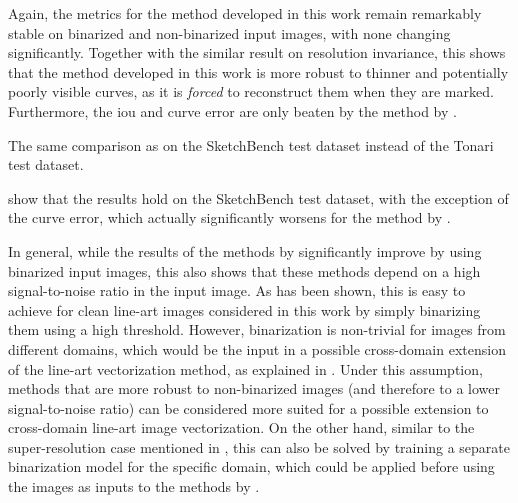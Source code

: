 Again, the metrics for the method developed in this work remain remarkably stable on binarized and non-binarized input images, with none changing significantly. Together with the similar result on resolution invariance, this shows that the method developed in this work is more robust to thinner and potentially poorly visible curves, as it is \emph{forced} to reconstruct them when they are marked. Furthermore, the \gls{iou} and curve error are only beaten by the method by \citet{Puhachov2021KeypointPolyvector}.

\begin{table}[h]
    \centering
    
    \caption{The same comparison as  on the SketchBench test dataset instead of the Tonari test dataset.}
    \label{tab:sketchbench-True-512-0.512}
\end{table}

 show that the results hold on the SketchBench test dataset, with the exception of the curve error, which actually significantly worsens for the method by \citet{Puhachov2021KeypointPolyvector}.

In general, while the results of the methods by \citet{Puhachov2021KeypointPolyvector,autotrace} significantly improve by using binarized input images, this also shows that these methods depend on a high signal-to-noise ratio in the input image. As has been shown, this is easy to achieve for clean line-art images considered in this work by simply binarizing them using a high threshold. However, binarization is non-trivial for images from different domains, which would be the input in a possible cross-domain extension of the line-art vectorization method, as explained in . Under this assumption, methods that are more robust to non-binarized images (and therefore to a lower signal-to-noise ratio) can be considered more suited for a possible extension to cross-domain line-art image vectorization. On the other hand, similar to the super-resolution case mentioned in , this can also be solved by training a separate binarization model for the specific domain, which could be applied before using the images as inputs to the methods by \citet{Puhachov2021KeypointPolyvector,autotrace}.

